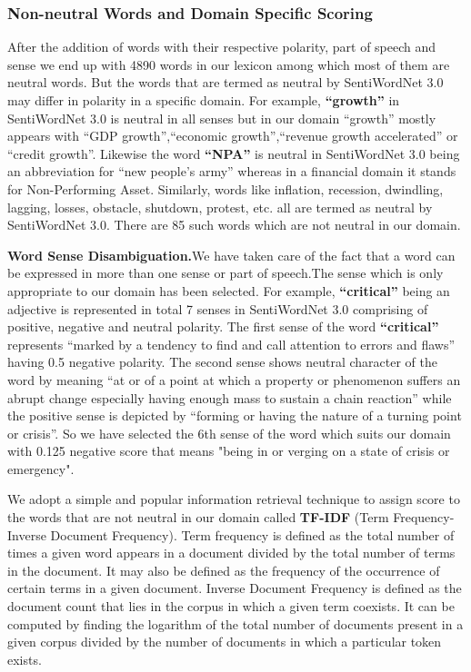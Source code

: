 \documentclass[conference]{IEEEtran}
\begin{document}
\subsubsection{Non-neutral Words and Domain Specific Scoring}
After the addition of words with their respective polarity, part of speech and sense we end up with 4890 words in our lexicon among which most of them are neutral words. But the words that are termed as neutral by SentiWordNet 3.0 may differ in polarity in a specific domain. For example, \textbf{``growth''} in SentiWordNet 3.0 is neutral in all senses but in our domain ``growth'' mostly appears with ``GDP growth'',``economic growth'',``revenue growth accelerated'' or ``credit growth''. Likewise the word \textbf{``NPA''} is neutral in SentiWordNet 3.0 being an abbreviation for ``new people's army'' whereas in a financial domain it stands for Non-Performing Asset. Similarly, words like inflation, recession, dwindling, lagging, losses, obstacle, shutdown, protest, etc. all are termed as neutral by SentiWordNet 3.0. There are 85 such words which are not neutral in our domain.

\textbf{Word Sense Disambiguation.}We have taken care of the fact that a word can be expressed in more than one sense or part of speech.The sense which is only appropriate to our domain has been selected. For example, \textbf{``critical''} being an adjective is represented in total 7 senses in SentiWordNet 3.0 comprising of positive, negative and neutral polarity. The first sense of the word \textbf{``critical''} represents ``marked by a tendency to find and call attention to errors and flaws'' having 0.5 negative polarity. The second sense shows neutral character of the word by meaning ``at or of a point at which a property or phenomenon suffers an abrupt change especially having enough mass to sustain a chain reaction'' while the positive sense is depicted by ``forming or having the nature of a turning point or crisis''. So we have selected the 6th sense of the word which suits our domain with 0.125 negative score that means "being in or verging on a state of crisis or emergency".

We adopt a simple and popular information retrieval technique to assign score to the words that are not neutral in our domain called \textbf{TF-IDF} (Term Frequency-Inverse
Document Frequency)\cite{c12}. Term frequency is defined as the total number of times a given word appears
in a document divided by the total number of terms in the document. It may also be defined as the
frequency of the occurrence of certain terms in a given document. Inverse Document Frequency is defined as the
document count that lies in the corpus in which a given term coexists.
It can be computed by finding the logarithm of the total number of documents
present in a given corpus divided by the number of documents in which a particular
token exists.
\end{document}

